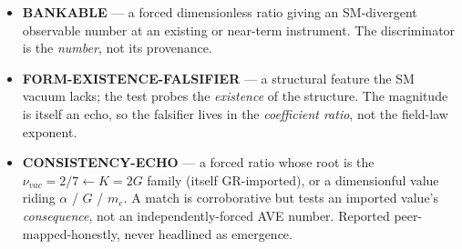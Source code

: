 \begin{itemize}
    \item \textbf{BANKABLE} --- a forced dimensionless ratio giving an SM-divergent observable number at an existing or near-term instrument. The discriminator is the \emph{number}, not its provenance.
    \item \textbf{FORM-EXISTENCE-FALSIFIER} --- a structural feature the SM vacuum lacks; the test probes the \emph{existence} of the structure. The magnitude is itself an echo, so the falsifier lives in the \emph{coefficient ratio}, not the field-law exponent.
    \item \textbf{CONSISTENCY-ECHO} --- a forced ratio whose root is the $\nu_{vac} = 2/7 \leftarrow K = 2G$ family (itself GR-imported), or a dimensionful value riding $\alpha$ / $G$ / $m_e$. A match is corroborative but tests an imported value's \emph{consequence}, not an independently-forced AVE number. Reported peer-mapped-honestly, never headlined as emergence.
\end{itemize}

